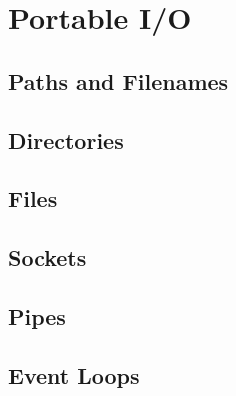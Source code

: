\chapter{Portable I/O}
\section{Paths and Filenames}
\section{Directories}
\section{Files}
\section{Sockets}
\section{Pipes}
\section{Event Loops}
